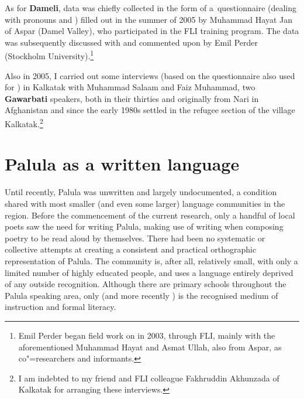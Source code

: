 As for \textbf{Dameli}, data was chiefly collected in the form of a~questionnaire (dealing with
pronouns and ) filled out in the summer of 2005 by Muhammad Hayat Jan of Aspar (Damel
Valley), who participated in the FLI training program. The data was subsequently discussed with and
commented upon by Emil Perder (Stockholm University).\footnote{Emil Perder began field work on
  \iliDameli in 2003, through FLI, mainly with the aforementioned Muhammad Hayat and Asmat Ullah, also
  from Aspar, as co"=researchers and informants.}


Also in 2005, I carried out some interviews (based on the questionnaire also used for \iliDameli) in Kalkatak with Muhammad Salaam and Faiz Muhammad, two \textbf{Gawarbati} speakers, both in their thirties and originally from Nari in Afghanistan and since the early 1980s settled in the refugee section of the village Kalkatak.\footnote{I am indebted to my friend and FLI colleague Fakhruddin Akhunzada of Kalkatak for arranging these interviews.}


\section{Palula as a written language}
\label{sec:1-6b}

Until recently, Palula was unwritten and largely undocumented, a condition shared with most smaller (and even some larger) language communities in the region. Before the commencement of the current research, only a handful of local poets saw the need for writing Palula, making use of \iliUrdu writing when composing poetry to be read aloud by themselves. There had been no systematic or collective attempts at creating a consistent and practical orthographic representation of Palula. The community is, after all, relatively small, with only a limited number of highly educated people, and uses a language entirely deprived of any outside recognition. Although there are primary schools throughout the Palula speaking area, only \iliUrdu (and more recently \iliEnglish) is the recognised medium of instruction and formal literacy.


